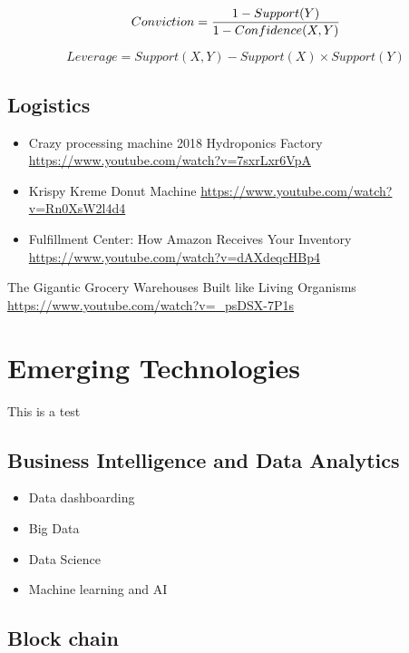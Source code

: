 \documentclass[]{book}
\providecommand{\tightlist}{%
  \setlength{\itemsep}{0pt}\setlength{\parskip}{0pt}}
\begin{document}
\[Conviction = {1 - Support(Y)\over 1 - Confidence(X,Y)}\]

\[Leverage = Support(X,Y) - Support(X)\times Support(Y)\]

\hypertarget{logistics}{%
\section{Logistics}\label{logistics}}

\begin{itemize}
\item
  Crazy processing machine 2018 \textbar{} Hydroponics Factory
  \url{https://www.youtube.com/watch?v=7sxrLxr6VpA}
\item
  Krispy Kreme Donut Machine
  \url{https://www.youtube.com/watch?v=Rn0XsW2l4d4}
\item
  Fulfillment Center:
  How Amazon Receives Your Inventory \url{https://www.youtube.com/watch?v=dAXdeqcHBp4}
\end{itemize}

The Gigantic Grocery Warehouses Built like Living Organisms \url{https://www.youtube.com/watch?v=_psDSX-7P1s}

\hypertarget{emerging-technologies}{%
\chapter{Emerging Technologies}\label{emerging-technologies}}

This is a test

\hypertarget{business-intelligence-and-data-analytics}{%
\section{Business Intelligence and Data Analytics}\label{business-intelligence-and-data-analytics}}

\begin{itemize}
\tightlist
\item
  Data dashboarding
\item
  Big Data
\item
  Data Science
\item
  Machine learning and AI
\end{itemize}

\hypertarget{block-chain}{%
\section{Block chain}\label{block-chain}}
\end{document}
